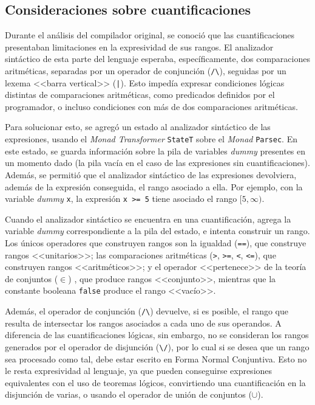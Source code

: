 \subsection{Consideraciones sobre cuantificaciones}

Durante el análisis del compilador original, se conoció que las cuantificaciones
presentaban limitaciones en la expresividad de sus rangos. El analizador
sintáctico de esta parte del lenguaje esperaba, específicamente, dos
comparaciones aritméticas, separadas por un operador de conjunción
(\texttt{/\textbackslash{}}), seguidas por un lexema <<barra vertical>>
(\texttt{|}). Esto impedía expresar condiciones lógicas distintas de
comparaciones aritméticas, como predicados definidos por el programador, o
incluso condiciones con más de dos comparaciones aritméticas.

Para solucionar esto, se agregó un estado al analizador sintáctico de las
expresiones, usando el \emph{Monad Transformer} \texttt{StateT} sobre el
\emph{Monad} \texttt{Parsec}. En este estado, se guarda información sobre la
pila de variables \emph{dummy} presentes en un momento dado (la pila vacía en el
caso de las expresiones sin cuantificaciones). Además, se permitió que el
analizador sintáctico de las expresiones devolviera, además de la expresión
conseguida, el rango asociado a ella. Por ejemplo, con la variable \emph{dummy}
\texttt{x}, la expresión \texttt{x >= 5} tiene asociado el rango $[5, \infty)$.

Cuando el analizador sintáctico se encuentra en una cuantificación, agrega la
variable \emph{dummy} correspondiente a la pila del estado, e intenta construir
un rango. Los únicos operadores que construyen rangos son la igualdad
(\texttt{==}), que construye rangos <<unitarios>>; las comparaciones aritméticas
(\texttt{>}, \texttt{>=}, \texttt{<}, \texttt{<=}), que construyen rangos
<<aritméticos>>; y el operador <<pertenece>> de la teoría de conjuntos ($\in$)
, que produce rangos <<conjunto>>, mientras que la
constante booleana \texttt{false} produce el rango <<vacío>>.

Además, el operador de conjunción (\texttt{/\textbackslash{}}) devuelve, si es
posible, el rango que resulta de intersectar los rangos asociados a cada uno de
sus operandos. A diferencia de las cuantificaciones lógicas, sin embargo, no se
consideran los rangos generados por el operador de disjunción
(\texttt{\textbackslash{}/}), por lo cual si se desea que un rango sea procesado
como tal, debe estar escrito en Forma Normal Conjuntiva. Esto no le resta
expresividad al lenguaje, ya que pueden conseguirse expresiones equivalentes con
el uso de teoremas lógicos, convirtiendo una cuantificación en la disjunción de
varias, o usando el operador de unión de conjuntos ($\cup$).

